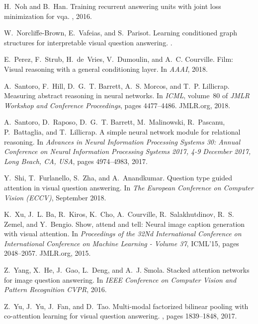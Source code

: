 \documentclass[10pt,twocolumn,letterpaper]{article}
\begin{document}
\begin{thebibliography}{10}
H.~Noh and B.~Han.
\newblock Training recurrent answering units with joint loss minimization for
  vqa.
, 2016.

W.~Norcliffe-Brown, E.~Vafeias, and S.~Parisot.
\newblock Learning conditioned graph structures for interpretable visual
  question answering.
.

E.~Perez, F.~Strub, H.~de~Vries, V.~Dumoulin, and A.~C. Courville.
\newblock Film: Visual reasoning with a general conditioning layer.
\newblock In {\em AAAI}, 2018.

A.~Santoro, F.~Hill, D.~G.~T. Barrett, A.~S. Morcos, and T.~P. Lillicrap.
\newblock Measuring abstract reasoning in neural networks.
\newblock In {\em {ICML}}, volume~80 of {\em {JMLR} Workshop and Conference
  Proceedings}, pages 4477--4486. JMLR.org, 2018.

A.~Santoro, D.~Raposo, D.~G.~T. Barrett, M.~Malinowski, R.~Pascanu,
  P.~Battaglia, and T.~Lillicrap.
\newblock A simple neural network module for relational reasoning.
\newblock In {\em Advances in Neural Information Processing Systems 30: Annual
  Conference on Neural Information Processing Systems 2017, 4-9 December 2017,
  Long Beach, CA, {USA}}, pages 4974--4983, 2017.

Y.~Shi, T.~Furlanello, S.~Zha, and A.~Anandkumar.
\newblock Question type guided attention in visual question answering.
\newblock In {\em The European Conference on Computer Vision (ECCV)}, September
  2018.

K.~Xu, J.~L. Ba, R.~Kiros, K.~Cho, A.~Courville, R.~Salakhutdinov, R.~S. Zemel,
  and Y.~Bengio.
\newblock Show, attend and tell: Neural image caption generation with visual
  attention.
\newblock In {\em Proceedings of the 32Nd International Conference on
  International Conference on Machine Learning - Volume 37}, ICML'15, pages
  2048--2057. JMLR.org, 2015.

Z.~Yang, X.~He, J.~Gao, L.~Deng, and A.~J. Smola.
\newblock Stacked attention networks for image question answering.
\newblock In {\em {IEEE} Conference on Computer Vision and Pattern Recognition
  {CVPR}}, 2016.

Z.~Yu, J.~Yu, J.~Fan, and D.~Tao.
\newblock Multi-modal factorized bilinear pooling with co-attention learning
  for visual question answering.
, pages
  1839--1848, 2017.


\end{thebibliography}
\end{document}
